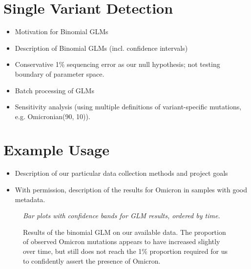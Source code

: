 \documentclass{article}
\newenvironment{tightemize}
{ \begin{itemize}
    \setlength{\itemsep}{0pt}
    \setlength{\parskip}{0pt}
    \setlength{\parsep}{0pt}     }
{ \end{itemize}                  }
\begin{document}
\section{Single Variant Detection}

\begin{tightemize}
    \item Motivation for Binomial GLMs
    \item Description of Binomial GLMs (incl. confidence intervals)
    \item Conservative 1\% sequencing error as our null hypothesis; not testing boundary of parameter space.
    \item Batch processing of GLMs
    \item Sensitivity analysis (using multiple definitions of variant-specific mutations, e.g. Omicronian(90, 10)).
\end{tightemize}






\section{Example Usage}

\begin{tightemize}
    \item Description of our particular data collection methods and project goals
    \item With permission, description of the results for Omicron in samples with good metadata.
\end{tightemize}

\begin{figure}[ht!]
\vspace{2cm}
\centering
\emph{Bar plots with confidence bands for GLM results, ordered by time.}
\vspace{2cm}
\caption{Results of the binomial GLM on our available data. The proportion of observed Omicron mutations appears to have increased slightly over time, but still does not reach the 1\% proportion required for us to confidently assert the presence of Omicron.}
\label{fig:binomial_results}
\end{figure}
\end{document}
